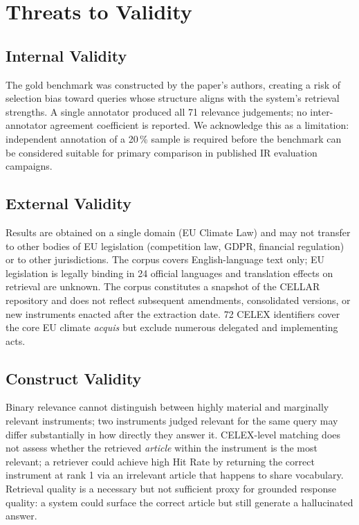 \documentclass{iosart2x}
\begin{document}
\section{Threats to Validity}
\label{sec:validity}

\subsection{Internal Validity}
\label{sec:validity-internal}

The gold benchmark was constructed by the paper's authors, creating
a risk of selection bias toward queries whose structure aligns with
the system's retrieval strengths.  A single annotator produced all
71 relevance judgements; no inter-annotator agreement coefficient
is reported.  We acknowledge this as a limitation: independent
annotation of a 20\,\% sample is required before the benchmark
can be considered suitable for primary comparison in published IR
evaluation campaigns.

\subsection{External Validity}
\label{sec:validity-external}

Results are obtained on a single domain (EU Climate Law) and may not
transfer to other bodies of EU legislation (competition law, GDPR,
financial regulation) or to other jurisdictions.  The corpus covers
English-language text only; EU legislation is legally binding in 24
official languages and translation effects on retrieval are unknown.
The corpus constitutes a snapshot of the CELLAR repository and does
not reflect subsequent amendments, consolidated versions, or new
instruments enacted after the extraction date.  72 CELEX identifiers
cover the core EU climate \textit{acquis} but exclude numerous
delegated and implementing acts.

\subsection{Construct Validity}
\label{sec:validity-construct}

Binary relevance cannot distinguish between highly material and
marginally relevant instruments; two instruments judged relevant for
the same query may differ substantially in how directly they answer it.
CELEX-level matching does not assess whether the retrieved
\emph{article} within the instrument is the most relevant; a retriever
could achieve high Hit Rate by returning the correct instrument at rank
1 via an irrelevant article that happens to share vocabulary.
Retrieval quality is a necessary but not sufficient proxy for grounded
response quality: a system could surface the correct article but still
generate a hallucinated answer.
\end{document}
